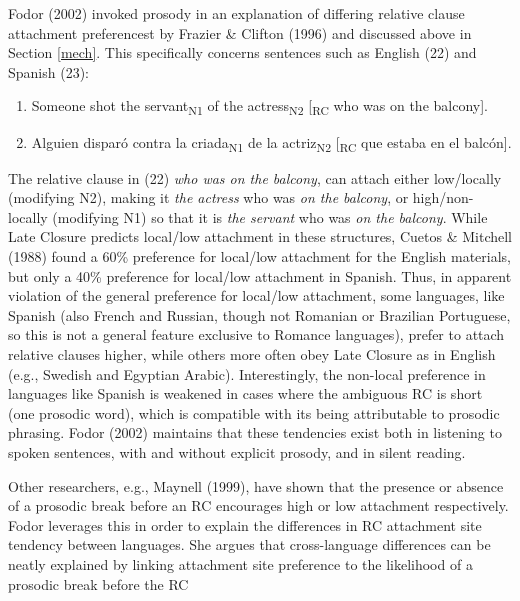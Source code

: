 \documentclass[12pt,oneside]{book}
\providecommand{\tightlist}{%
  \setlength{\itemsep}{0pt}\setlength{\parskip}{0pt}}
\begin{document}
Fodor (2002) invoked prosody in an explanation of differing relative clause attachment preferencest by Frazier \& Clifton (1996) and discussed above in Section \ref{mech}. This specifically concerns sentences such as English (22) and Spanish (23):

\begin{enumerate}
\def\labelenumi{(\arabic{enumi})}
\setcounter{enumi}{21}
\tightlist
\item
  Someone shot the servant\textsubscript{N1} of the actress\textsubscript{N2} {[}\textsubscript{RC} who was on the balcony{]}.
\item
  Alguien disparó contra la criada\textsubscript{N1} de la actriz\textsubscript{N2} {[}\textsubscript{RC} que estaba en el balcón{]}.
\end{enumerate}

The relative clause in (22) \emph{who was on the balcony}, can attach either low/locally (modifying N2), making it \emph{the actress} who was \emph{on the balcony}, or high/non-locally (modifying N1) so that it is \emph{the servant} who was \emph{on the balcony}. While Late Closure predicts local/low attachment in these structures, Cuetos \& Mitchell (1988) found a 60\% preference for local/low attachment for the English materials, but only a 40\% preference for local/low attachment in Spanish. Thus, in apparent violation of the general preference for local/low attachment, some languages, like Spanish (also French and Russian, though not Romanian or Brazilian Portuguese, so this is not a general feature exclusive to Romance languages), prefer to attach relative clauses higher, while others more often obey Late Closure as in English (e.g., Swedish and Egyptian Arabic). Interestingly, the non-local preference in languages like Spanish is weakened in cases where the ambiguous RC is short (one prosodic word), which is compatible with its being attributable to prosodic phrasing. Fodor (2002) maintains that these tendencies exist both in listening to spoken sentences, with and without explicit prosody, and in silent reading.

Other researchers, e.g., Maynell (1999), have shown that the presence or absence of a prosodic break before an RC encourages high or low attachment respectively. Fodor leverages this in order to explain the differences in RC attachment site tendency between languages. She argues that cross-language differences can be neatly explained by linking attachment site preference to the likelihood of a prosodic break before the RC
\end{document}
